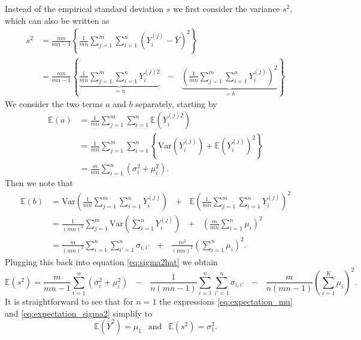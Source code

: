 \documentclass{article}
\newcommand{\sd}{s}
\newcommand{\mean}{\bar{Y}}
\begin{document}
Instead of the empirical standard deviation $\sd$ we first consider the variance $\sd^2$, which can also be written as
\begin{align}
\sd^2 & = \frac{mn}{mn - 1} \left\{\frac{1}{mn} \sum_{j = 1}^m \sum_{i = 1}^n \left(Y_i^{(j)} - \mean\right)^2 \right\}\\
& = \frac{mn}{mn - 1} \left\{ \underbrace{\frac{1}{mn} \sum_{j = 1}^m \sum_{i = 1}^n Y_i^{(j)2}}_{= a} \ \ \ - \ \ \ \underbrace{\left(\frac{1}{mn} \sum_{j = 1}^m \sum_{i = 1}^n Y_i^{(j)} \right)^2}_{= b} \right\} \label{eq:sigma2hat}
\end{align}
We consider the two terms $a$ and $b$ separately, starting by
\begin{align*}
\mathbb{E}(a) & = \frac{1}{mn} \sum_{j = 1}^m \sum_{i = 1}^n \mathbb{E}\left(Y_i^{(j)2}\right)\\
& = \frac{1}{mn} \sum_{j = 1}^m \sum_{i = 1}^n \left\{ \text{Var}\left(Y_i^{(j)}\right) + \mathbb{E}\left(Y_i^{(j)}\right)^2 \right\}\\
& = \frac{m}{mn} \sum_{i = 1}^n (\sigma_{i}^2 + \mu_i^2).
\end{align*}
Then we note that
\begin{align*}
\mathbb{E}(b) & = \text{Var}\left( \frac{1}{mn} \sum_{j = 1}^m \sum_{i = 1}^n Y_i^{(j)} \right) \ \ \ + \ \ \ \mathbb{E}\left(\frac{1}{mn}  \sum_{j = 1}^m \sum_{i = 1}^n Y_i^{(j)} \right)^2\\
& = \frac{1}{(mn)^2}\sum_{j = 1}^m \text{Var}\left(\sum_{i = 1}^n Y_i^{(j)} \right) \ \ \ + \ \ \ \left(\frac{m}{mn} \sum_{i = 1}^n \mu_i\right)^2\\
& = \frac{m}{(mn)^2} \sum_{i = 1}^n \sum_{i' = 1}^n \sigma_{i,i'} \ \ \ + \ \ \ \frac{m^2}{(mn)^2}\left(\sum_{i = 1}^n \mu_i\right)^2.
\end{align*}
Plugging this back into equation \eqref{eq:sigma2hat} we obtain
\begin{equation}
\mathbb{E}(\sd^2) = \frac{m}{mn - 1} \sum_{i = 1}^n (\sigma_{i}^2 + \mu_i^2) \ \ \ - \ \ \ \frac{1}{n(mn - 1)} \sum_{i = 1}^n \sum_{i' = 1}^n \sigma_{i,i'} \ \ \ - \ \ \ \frac{m}{n(mn - 1)}\left(\sum_{i = 1}^K \mu_i\right)^2.
\label{eq:expectation_sigma2}
\end{equation}
It is straightforward to see that for $n = 1$ the expressions \eqref{eq:expectation_mu} and \eqref{eq:expectation_sigma2} simplify to
$$
\mathbb{E}(\mean^2) = \mu_1 \ \ \text{ and } \ \ \mathbb{E}(\sd^2) = \sigma^2_1.
$$
\end{document}
